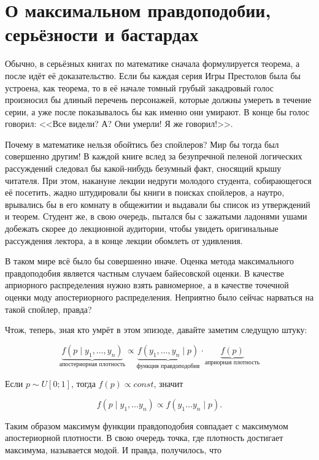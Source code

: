 \section{О максимальном правдоподобии, серьёзности и бастардах}


Обычно, в серьёзных книгах по математике сначала формулируется теорема, а после идёт её доказательство. Если бы каждая серия Игры Престолов была бы устроена, как теорема, то в её начале томный грубый закадровый голос произносил бы длиный перечень персонажей, которые должны умереть в течение серии, а уже после показывалось бы как именно они умирают. В конце бы голос говорил: <<Все видели? А? Они умерли! Я же говорил!>>.

Почему в математике нельзя обойтись без спойлеров? Мир бы тогда был совершенно другим! В каждой книге вслед за безупречной пеленой логических рассуждений следовал бы какой-нибудь безумный факт, сносящий крышу читателя. При этом, накануне лекции недруги молодого студента, собирающегося её посетить, жадно штудировали бы книги в поисках спойлеров, а наутро, врывались бы в его комнату в общежитии и выдавали бы список из утверждений и теорем. Студент же, в свою очередь, пытался бы с зажатыми ладонями ушами добежать скорее до лекционной аудитории, чтобы увидеть оригинальные рассуждения лектора, а в конце лекции обомлеть от удивления.

В таком мире всё было бы совершенно иначе. Оценка метода максимального правдоподобия является частным случаем байесовской оценки. В качестве априорного распределения нужно взять равномерное, а в качестве точечной оценки моду апостериорного распределения. Неприятно было сейчас нарваться на такой спойлер, правда?

Чтож, теперь, зная кто умрёт в этом эпизоде, давайте заметим следущую штуку:

\[ \underbrace{f(p \mid y_1, \ldots, y_n)}_{\text{апостериорная плотность}} \propto \underbrace{f(y_1, \ldots, y_n \mid p)}_{\text{функция правдоподобия}} \cdot \underbrace{f(p)}_{\text{априорная плотность}} \]  

Если $p \sim U[0;1]$, тогда $f(p) \propto const$, значит 

\[f(p \mid y_1, \ldots y_n) \propto f(y_1 \ldots y_n \mid p).\] 

Таким образом максимум функции правдоподобия совпадает с максимумом апостериорной плотности. В свою очередь точка, где плотность достигает максимума, называется модой.
И правда, получилось,  что

